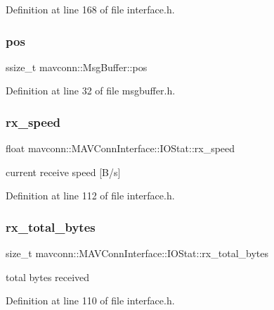 Definition at line 168 of file interface.\+h.

\mbox{\label{group__mavconn_gaf3493729d445b0f55b2ced8cfc5fa0f6}} 
\subsubsection{\texorpdfstring{pos}{pos}}
{\footnotesize\ttfamily ssize\+\_\+t mavconn\+::\+Msg\+Buffer\+::pos}



Definition at line 32 of file msgbuffer.\+h.

\mbox{\label{group__mavconn_gaf125917de0e57f9f394f038c71799fa0}} 
\subsubsection{\texorpdfstring{rx\_speed}{rx\_speed}}
{\footnotesize\ttfamily float mavconn\+::\+M\+A\+V\+Conn\+Interface\+::\+I\+O\+Stat\+::rx\+\_\+speed}



current receive speed \mbox{[}B/s\mbox{]} 



Definition at line 112 of file interface.\+h.

\mbox{\label{group__mavconn_ga3f5e58792c58b0400dcd903c821e97cb}} 
\subsubsection{\texorpdfstring{rx\_total\_bytes}{rx\_total\_bytes}}
{\footnotesize\ttfamily size\+\_\+t mavconn\+::\+M\+A\+V\+Conn\+Interface\+::\+I\+O\+Stat\+::rx\+\_\+total\+\_\+bytes}



total bytes received 



Definition at line 110 of file interface.\+h.

\mbox{\label{group__mavconn_ga2dc764873c9185f0399bf41fbadff32f}} 
